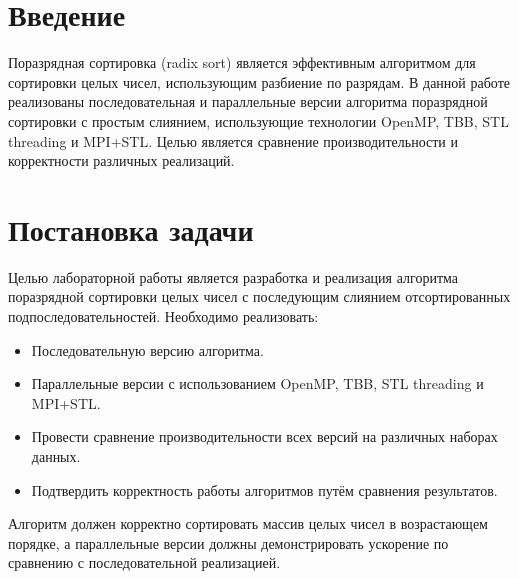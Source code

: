 \documentclass[a4paper,12pt]{article}
\begin{document}
\section{Введение}
\sloppy
Поразрядная сортировка (radix sort) является эффективным алгоритмом для сортировки целых чисел, использующим разбиение по разрядам. В данной работе реализованы последовательная и параллельные версии алгоритма поразрядной сортировки с простым слиянием, использующие технологии OpenMP, TBB, STL threading и MPI+STL. Целью является сравнение производительности и корректности различных реализаций.
\fussy

\section{Постановка задачи}
Целью лабораторной работы является разработка и реализация алгоритма поразрядной сортировки целых чисел с последующим слиянием отсортированных подпоследовательностей. Необходимо реализовать:
\begin{itemize}
    \item Последовательную версию алгоритма.
    \item Параллельные версии с использованием OpenMP, TBB, STL threading и MPI+STL.
    \item Провести сравнение производительности всех версий на различных наборах данных.
    \item Подтвердить корректность работы алгоритмов путём сравнения результатов.
\end{itemize}
Алгоритм должен корректно сортировать массив целых чисел в возрастающем порядке, а параллельные версии должны демонстрировать ускорение по сравнению с последовательной реализацией.

\end{document}
